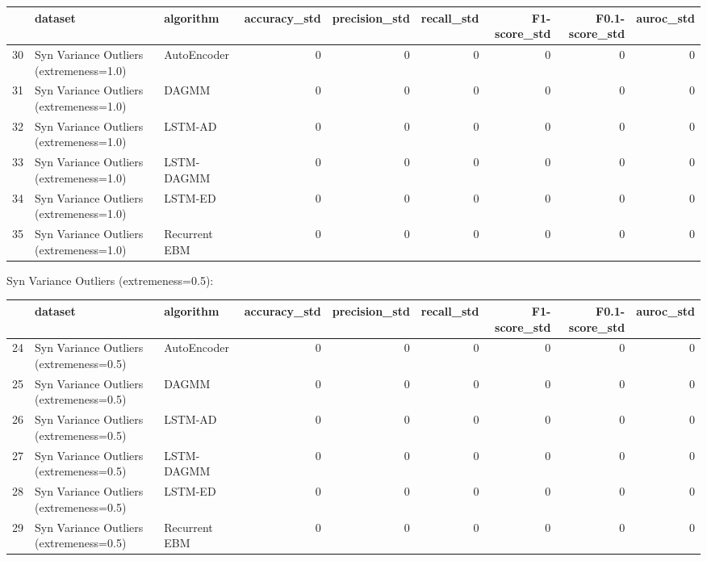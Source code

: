 \begin{tabular}{rllrrrrrr}
\hline
    & dataset                                 & algorithm     &   accuracy\_std &   precision\_std &   recall\_std &   F1-score\_std &   F0.1-score\_std &   auroc\_std \\
\hline
 30 & Syn Variance Outliers (extremeness=1.0) & AutoEncoder   &              0 &               0 &            0 &              0 &                0 &           0 \\
 31 & Syn Variance Outliers (extremeness=1.0) & DAGMM         &              0 &               0 &            0 &              0 &                0 &           0 \\
 32 & Syn Variance Outliers (extremeness=1.0) & LSTM-AD       &              0 &               0 &            0 &              0 &                0 &           0 \\
 33 & Syn Variance Outliers (extremeness=1.0) & LSTM-DAGMM    &              0 &               0 &            0 &              0 &                0 &           0 \\
 34 & Syn Variance Outliers (extremeness=1.0) & LSTM-ED       &              0 &               0 &            0 &              0 &                0 &           0 \\
 35 & Syn Variance Outliers (extremeness=1.0) & Recurrent EBM &              0 &               0 &            0 &              0 &                0 &           0 \\
\hline
\end{tabular}

Syn Variance Outliers (extremeness=0.5):

\begin{tabular}{rllrrrrrr}
\hline
    & dataset                                 & algorithm     &   accuracy\_std &   precision\_std &   recall\_std &   F1-score\_std &   F0.1-score\_std &   auroc\_std \\
\hline
 24 & Syn Variance Outliers (extremeness=0.5) & AutoEncoder   &              0 &               0 &            0 &              0 &                0 &           0 \\
 25 & Syn Variance Outliers (extremeness=0.5) & DAGMM         &              0 &               0 &            0 &              0 &                0 &           0 \\
 26 & Syn Variance Outliers (extremeness=0.5) & LSTM-AD       &              0 &               0 &            0 &              0 &                0 &           0 \\
 27 & Syn Variance Outliers (extremeness=0.5) & LSTM-DAGMM    &              0 &               0 &            0 &              0 &                0 &           0 \\
 28 & Syn Variance Outliers (extremeness=0.5) & LSTM-ED       &              0 &               0 &            0 &              0 &                0 &           0 \\
 29 & Syn Variance Outliers (extremeness=0.5) & Recurrent EBM &              0 &               0 &            0 &              0 &                0 &           0 \\
\hline
\end{tabular}

